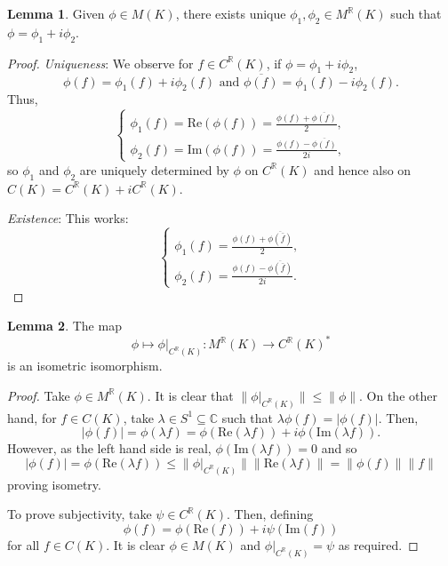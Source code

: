 \documentclass[]{article}
\theoremstyle{definition}
\newtheorem{lemma}{Lemma}[section]
\begin{document}
\begin{lemma}
  Given \(\phi \in M(K)\), there exists unique \(\phi_1, \phi_2 \in M^\mathbb{R}(K)\) such that \(\phi = \phi_1 + i\phi_2\).
\end{lemma}
\begin{proof}
  \textit{Uniqueness}: We observe for \(f \in C^\mathbb{R}(K)\), if \(\phi = \phi_1 + i\phi_2\), 
  \[\phi(f) = \phi_1(f) + i \phi_2(f) \text{ and } \overline{\phi(f)} = \phi_1(f) - i\phi_2(f).\]
  Thus, 
  \[\begin{cases}
    \phi_1(f) = \text{Re}(\phi(f)) = \frac{\phi(f) + \overline{\phi(f)}}{2}, \\
    \phi_2(f) = \text{Im}(\phi(f)) = \frac{\phi(f) - \overline{\phi(f)}}{2i},
  \end{cases}\]
  so \(\phi_1\) and \(\phi_2\) are uniquely determined by \(\phi\) on \(C^\mathbb{R}(K)\) and hence 
  also on \(C(K) = C^\mathbb{R}(K) + iC^\mathbb{R}(K)\).

  \textit{Existence}: This works: 
  \[\begin{cases}
    \phi_1(f) = \frac{\phi(f) + \overline{\phi(\bar f)}}{2}, \\
    \phi_2(f) = \frac{\phi(f) - \overline{\phi(\bar f)}}{2i}.
  \end{cases}\]
\end{proof}

\begin{lemma}
  The map 
  \[\phi \mapsto \phi|_{C^\mathbb{R}(K)} : M^\mathbb{R}(K) \to C^\mathbb{R}(K)^*\]
  is an isometric isomorphism.
\end{lemma}
\begin{proof}
  Take \(\phi \in M^\mathbb{R}(K)\). It is clear that \(\|\phi|_{C^\mathbb{R}(K)}\| \le \|\phi\|\).
  On the other hand, for \(f \in C(K)\), take \(\lambda \in S^1 \subseteq \mathbb{C}\) such that 
  \(\lambda\phi(f) = |\phi(f)|\). Then, 
  \[|\phi(f)| = \phi(\lambda f) = \phi(\text{Re}(\lambda f)) + i \phi(\text{Im}(\lambda f)).\]
  However, as the left hand side is real, \(\phi(\text{Im}(\lambda f)) = 0\) and so 
  \[|\phi(f)| = \phi(\text{Re}(\lambda f)) \le \|\phi|_{C^\mathbb{R}(K)}\| \|\text{Re}(\lambda f)\|
    = \|\phi(f)\| \|f\|\]
  proving isometry.

  To prove subjectivity, take \(\psi \in C^\mathbb{R}(K)\). Then, defining 
  \[\phi(f) = \phi(\text{Re}(f)) + i\psi(\text{Im}(f))\]
  for all \(f \in C(K)\). It is clear \(\phi \in M(K)\) and \(\phi|_{C^\mathbb{R}(K)} = \psi\)
  as required.
\end{proof}
\end{document}
